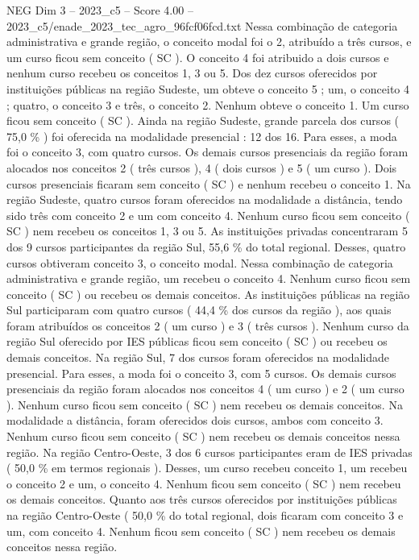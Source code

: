 \begin{textsample}{NEG Dim 3 – 2023\_c5 – Score 4.00 – 2023\_c5/enade\_2023\_tec\_agro\_96fcf06fcd.txt}
Nessa combinação de categoria administrativa e grande região, o conceito modal foi o 2, atribuído a três cursos, e um curso ficou sem conceito ( SC ).
O conceito 4 foi atribuido a dois cursos e nenhum curso recebeu os conceitos 1, 3 ou 5.
Dos dez cursos oferecidos por instituições públicas na região Sudeste, um obteve o conceito 5 ; um, o conceito 4 ; quatro, o conceito 3 e três, o conceito 2.
Nenhum obteve o conceito 1.
Um curso ficou sem conceito ( SC ).
Ainda na região Sudeste, grande parcela dos cursos ( 75,0 \% ) foi oferecida na modalidade presencial : 12 dos 16.
Para esses, a moda foi o conceito 3, com quatro cursos.
Os demais cursos presenciais da região foram alocados nos conceitos 2 ( três cursos ), 4 ( dois cursos ) e 5 ( um curso ).
Dois cursos presenciais ficaram sem conceito ( SC ) e nenhum recebeu o conceito 1.
Na região Sudeste, quatro cursos foram oferecidos na modalidade a distância, tendo sido três com conceito 2 e um com conceito 4.
Nenhum curso ficou sem conceito ( SC ) nem recebeu os conceitos 1, 3 ou 5.
As instituições privadas concentraram 5 dos 9 cursos participantes da região Sul, 55,6 \% do total regional.
Desses, quatro cursos obtiveram conceito 3, o conceito modal.
Nessa combinação de categoria administrativa e grande região, um recebeu o conceito 4.
Nenhum curso ficou sem conceito ( SC ) ou recebeu os demais conceitos.
As instituições públicas na região Sul participaram com quatro cursos ( 44,4 \% dos cursos da região ), aos quais foram atribuídos os conceitos 2 ( um curso ) e 3 ( três cursos ).
Nenhum curso da região Sul oferecido por IES públicas ficou sem conceito ( SC ) ou recebeu os demais conceitos.
Na região Sul, 7 dos cursos foram oferecidos na modalidade presencial.
Para esses, a moda foi o conceito 3, com 5 cursos.
Os demais cursos presenciais da região foram alocados nos conceitos 4 ( um curso ) e 2 ( um curso ).
Nenhum curso ficou sem conceito ( SC ) nem recebeu os demais conceitos.
Na modalidade a distância, foram oferecidos dois cursos, ambos com conceito 3.
Nenhum curso ficou sem conceito ( SC ) nem recebeu os demais conceitos nessa região.
Na região Centro-Oeste, 3 dos 6 cursos participantes eram de IES privadas ( 50,0 \% em termos regionais ).
Desses, um curso recebeu conceito 1, um recebeu o conceito 2 e um, o conceito 4.
Nenhum ficou sem conceito ( SC ) nem recebeu os demais conceitos.
Quanto aos três cursos oferecidos por instituições públicas na região Centro-Oeste ( 50,0 \% do total regional, dois ficaram com conceito 3 e um, com conceito 4.
Nenhum ficou sem conceito ( SC ) nem recebeu os demais conceitos nessa região.

\end{textsample}
